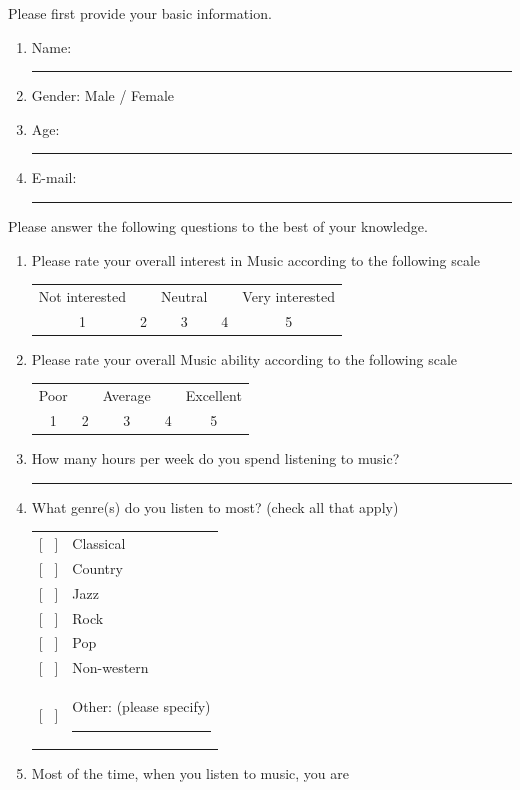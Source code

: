 \documentclass[a4paper,11pt]{article}
\newcommand{\myunderline}{\rule{2in}{.5pt}}
\begin{document}
{\begin{appendices}
Please first provide your basic information.

\begin{enumerate}
	\item Name: \myunderline
	\item Gender: Male / Female
	\item Age: \myunderline
	\item E-mail: \myunderline
\end{enumerate}
Please answer the following questions to the best of your knowledge.
\begin{enumerate}[resume]

	\item Please rate your overall interest in Music according to the following scale

	\begin{tabular}{c c c c c}
		Not interested & & Neutral & & Very interested \\
		1 & 2 & 3 & 4 & 5 \\
	\end{tabular}

	\item Please rate your overall Music ability according to the following scale

	\begin{tabular}{c c c c c}
		Poor & & Average & & Excellent \\
		1 & 2 & 3 & 4 & 5 \\
	\end{tabular}

	\item How many hours per week do you spend listening to music?

	\myunderline

	\item What genre(s) do you listen to most? (check all that apply)

	\begin{tabular}{l l}
		{[{ \ }]} & Classical \\
		{[{ \ }]} & Country \\
		{[{ \ }]} & Jazz \\
		{[{ \ }]} & Rock \\
		{[{ \ }]} & Pop \\
		{[{ \ }]} & Non-western \\
		{[{ \ }]} & Other: (please specify) \myunderline \\
	\end{tabular}

	\item Most of the time, when you listen to music, you are


\end{enumerate}
\end{appendices}}
\end{document}

